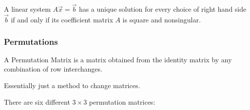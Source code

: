         \begin{thm}
            A linear system $A\vec{x} = \vec{b}$ has a unique solution for every choice of right hand side $\vec{b}$ if and only if its coefficient matrix $A$ is square and nonsingular.
        \end{thm}

        \subsubsection{Permutations}
        \begin{definition}
            A Permutation Matrix is a matrix obtained from the identity matrix by any combination of row interchanges.
        \end{definition}

        Essentially just a method to change matrices.

        There are six different $3\times3$ permutation matrices:

